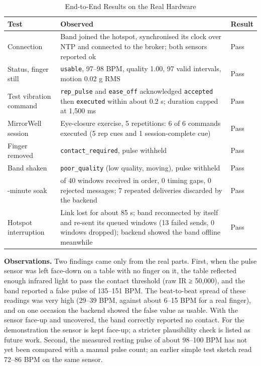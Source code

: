 \documentclass[12pt,letterpaper,oneside]{report}
\begin{document}
\begin{table}[H]
\centering\small{}
\caption{End-to-End Results on the Real Hardware}\label{tab:end-to-end-results-real-hardware}
\begin{tabular}{|>{\raggedright\arraybackslash}p{}|>{\raggedright\arraybackslash}p{}|>{\raggedright\arraybackslash}p{}|}
\hline
\rowcolor{headgray}\textbf{Test} & \textbf{Observed} & \textbf{Result} \\ \hline
Connection & Band joined the hotspot, synchronised its clock over NTP and connected to the broker; both sensors reported ok & Pass \\ \hline
Status, finger still & \texttt{usable}, 97–98 BPM, quality 1.00, 97 valid intervals, motion 0.02 g RMS & Pass \\ \hline
Test vibration command & \texttt{rep\_pulse} and \texttt{ease\_off} acknowledged \texttt{accepted} then \texttt{executed} within about 0.2 s; duration capped at 1,500 ms & Pass \\ \hline
MirrorWell session & Eye-closure exercise, 5 repetitions: 6 of 6 commands executed (5 rep cues and 1 session-complete cue) & Pass \\ \hline
Finger removed & \texttt{contact\_required}, pulse withheld & Pass \\ \hline
Band shaken & \texttt{poor\_quality} (low quality, moving), pulse withheld & Pass \\ \hline
10-minute soak & 40 of 40 windows received in order, 0 timing gaps, 0 rejected messages; 7 repeated deliveries discarded by the backend & Pass \\ \hline
Hotspot interruption & Link lost for about 85 s; band reconnected by itself and re-sent its queued windows (13 failed sends, 0 windows dropped); backend showed the band offline meanwhile & Pass \\ \hline
\end{tabular}
\end{table}

\textbf{Observations.} Two findings came only from the real parts. First, when the pulse sensor was left face-down on a table with no finger on it, the table reflected enough infrared light to pass the contact threshold (raw IR ≥ 50,000), and the band reported a false pulse of 135–151 BPM. The beat-to-beat spread of these readings was very high (29–39 BPM, against about 6–15 BPM for a real finger), and on one occasion the backend showed the false value as usable. With the sensor face-up and uncovered, the band correctly reported no contact. For the demonstration the sensor is kept face-up; a stricter plausibility check is listed as future work. Second, the measured resting pulse of about 98–100 BPM has not yet been compared with a manual pulse count; an earlier simple test sketch read 72–86 BPM on the same sensor.
\end{document}
